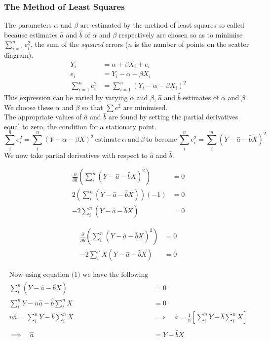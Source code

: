 \documentclass[11pt,a4paper]{article}
\theoremstyle{definition}
\begin{document}
\subsubsection{The Method of Least Squares}
The parameters $\alpha$ and $\beta$ are estimated by the method of least squares so called because estimates $\hat{a}$ and $\hat{b}$ of $\alpha$ and $\beta$ respectively are chosen so as to minimise $\sum\limits_{i=1}^{n}e_i^2$, the sum of the \emph{squared} errors ($n$ is the number of points on the scatter diagram).
\begin{align*}
Y_i &=\alpha +\beta X_i+e_i\\e_i&=Y_i-\alpha -\beta X_i\\ \sum^n_{i=1} e^2_i &=\sum^n_{i=1}(Y_i-\alpha -\beta X_i)^2
\end{align*}
This expression can be varied by varying $\alpha$ and $\beta$, $\hat{a}$ and $\hat{b}$ estimates of $\alpha$ and $\beta$. We choose these $\alpha$ and $\beta$ so that $\sum e^2$ are minimised.\\[1ex]
The appropriate values of $\hat{a}$ and $\hat{b}$ are found by setting the partial derivatives equal to zero, the condition for a stationary point.
\[\sum^n_ie_i^2=\sum^n_i(Y-\alpha -\beta X)^2\ \text{estimate}\ \alpha\ \text{and}\ \beta\ \text{to become}\ \sum^n_ie^2_i=\sum^n_i(Y-\hat{a}-\hat{b}X)^2\] We now take partial derivatives with respect to $\hat{a}$ and $\hat{b}$.

\begin{align*}
\frac{\partial}{\partial \hat{a}}\left(\sum^n_i(Y-\hat{a}-\hat{b}X)^2\right)&=0\\[1ex] 2\left(\sum^n_i(Y-\hat{a}-\hat{b}X)\right)(-1) &=0\\[1ex] -2\sum^n_i(Y-\hat{a}-\hat{b}X)&=0 \tag{1}\label{eq:ls1}
\end{align*}

\begin{align*}
\frac{\partial}{\partial \hat{b}}\left(\sum^n_i(Y-\hat{a}-\hat{b}X)^2\right)&=0\\[1ex] -2\sum^n_iX(Y-\hat{a}-\hat{b}X)&=0 \tag{2}\label{eq:ls2}
\end{align*}

\begin{align*}
\text{Now using equation (1) we have the following}\\
\sum^n_i(Y-\hat{a}-\hat{b}X)&=0\\[1ex] \sum^n_iY-n\hat{a}-\hat{b}\sum^n_iX&=0 \tag{3}\label{eq:ls3}\\[1ex] n\hat{a}=\sum^n_iY-\hat{b}\sum^n_iX\quad &\implies\quad  \hat{a}=\frac{1}{n}\left[\sum^n_iY-\hat{b}\sum^n_iX\right]\\[1ex]\\ \implies\quad \hat{a}&=\overline{Y}-\hat{b}\overline{X}
\end{align*}
\end{document}
